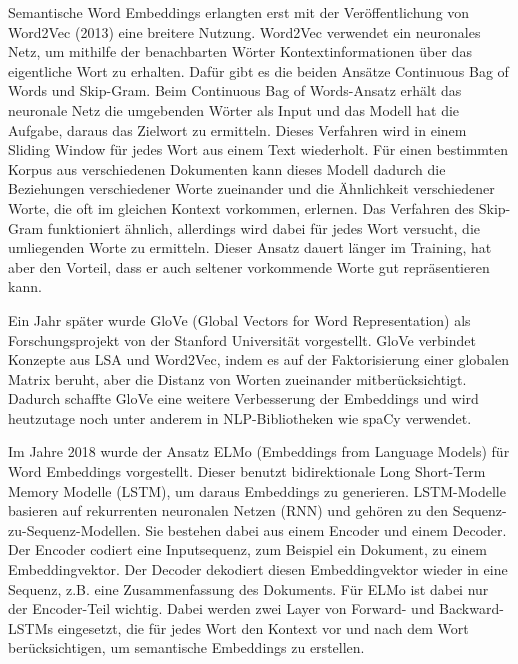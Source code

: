 Semantische Word Embeddings erlangten erst mit der Veröffentlichung von Word2Vec (2013) eine breitere Nutzung.
Word2Vec verwendet ein neuronales Netz, um mithilfe der benachbarten Wörter Kontextinformationen über das eigentliche Wort zu erhalten.
Dafür gibt es die beiden Ansätze Continuous Bag of Words und Skip-Gram.
Beim Continuous Bag of Words-Ansatz erhält das neuronale Netz die umgebenden Wörter als Input und das Modell hat die Aufgabe, daraus das Zielwort zu ermitteln.
Dieses Verfahren wird in einem Sliding Window für jedes Wort aus einem Text wiederholt.
Für einen bestimmten Korpus aus verschiedenen Dokumenten kann dieses Modell dadurch die Beziehungen verschiedener Worte zueinander und die Ähnlichkeit verschiedener Worte, die oft im gleichen Kontext vorkommen, erlernen.
Das Verfahren des Skip-Gram funktioniert ähnlich, allerdings wird dabei für jedes Wort versucht, die umliegenden Worte zu ermitteln.
Dieser Ansatz dauert länger im Training, hat aber den Vorteil, dass er auch seltener vorkommende Worte gut repräsentieren kann.

Ein Jahr später wurde GloVe (Global Vectors for Word Representation) als Forschungsprojekt von der Stanford Universität vorgestellt.
GloVe verbindet Konzepte aus LSA und Word2Vec, indem es auf der Faktorisierung einer globalen Matrix beruht, aber die Distanz von Worten zueinander mitberücksichtigt.
Dadurch schaffte GloVe eine weitere Verbesserung der Embeddings und wird heutzutage noch unter anderem in NLP-Bibliotheken wie spaCy verwendet.

Im Jahre 2018 wurde der Ansatz ELMo (Embeddings from Language Models) für Word Embeddings vorgestellt.
Dieser benutzt bidirektionale Long Short-Term Memory Modelle (LSTM), um daraus Embeddings zu generieren.
LSTM-Modelle basieren auf rekurrenten neuronalen Netzen (RNN) und gehören zu den Sequenz-zu-Sequenz-Modellen.
Sie bestehen dabei aus einem Encoder und einem Decoder.
Der Encoder codiert eine Inputsequenz, zum Beispiel ein Dokument, zu einem Embeddingvektor.
Der Decoder dekodiert diesen Embeddingvektor wieder in eine Sequenz, z.B. eine Zusammenfassung des Dokuments.
Für ELMo ist dabei nur der Encoder-Teil wichtig.
Dabei werden zwei Layer von Forward- und Backward-LSTMs eingesetzt, die für jedes Wort den Kontext vor und nach dem Wort berücksichtigen, um semantische Embeddings zu erstellen.

